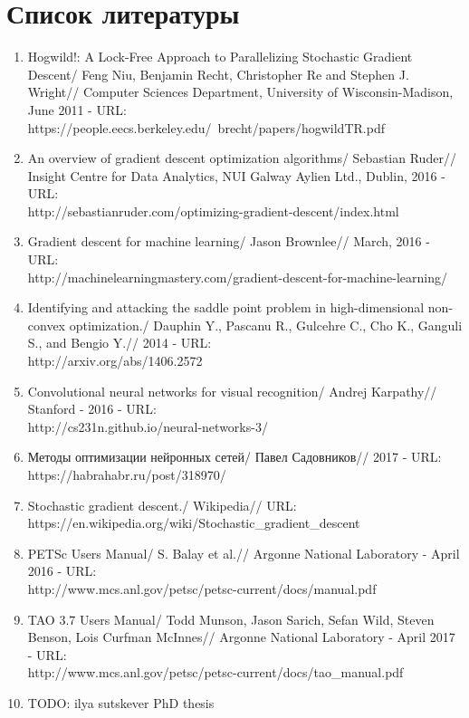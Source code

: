 \documentclass[12pt]{report}
\begin{document}
  \chapter*{Список литературы}
  \begin{enumerate}
    \item
    Hogwild!: A Lock-Free Approach to Parallelizing Stochastic Gradient Descent/
    Feng Niu, Benjamin Recht, Christopher Re and Stephen J. Wright//
    Computer Sciences Department, University of Wisconsin-Madison, June 2011 - URL:\\
    https://people.eecs.berkeley.edu/~brecht/papers/hogwildTR.pdf
    \item
    An overview of gradient descent optimization algorithms/
    Sebastian Ruder//
    Insight Centre for Data Analytics, NUI Galway Aylien Ltd., Dublin, 2016 - URL:\\
    http://sebastianruder.com/optimizing-gradient-descent/index.html
    \item
    Gradient descent for machine learning/
    Jason Brownlee//
    March, 2016 - URL:\\
    http://machinelearningmastery.com/gradient-descent-for-machine-learning/
    \item
    Identifying and attacking the saddle point problem in high-dimensional
    non-convex optimization./
    Dauphin Y., Pascanu R., Gulcehre C., Cho K., Ganguli S., and Bengio Y.//
    2014 - URL:\\
    http://arxiv.org/abs/1406.2572
    \item
    Convolutional neural networks for visual recognition/
    Andrej Karpathy//
    Stanford - 2016 - URL:\\
    http://cs231n.github.io/neural-networks-3/
    \item
    Методы оптимизации нейронных сетей/
    Павел Садовников//
    2017 - URL:\\
    https://habrahabr.ru/post/318970/
    \item
    Stochastic gradient descent./
    Wikipedia//
    URL:\\
    https://en.wikipedia.org/wiki/Stochastic\_gradient\_descent
    \item
    PETSc Users Manual/
    S. Balay et al.//
    Argonne National Laboratory - April 2016 - URL:\\
    http://www.mcs.anl.gov/petsc/petsc-current/docs/manual.pdf
    \item
    TAO 3.7 Users Manual/
    Todd Munson, Jason Sarich, Sefan Wild, Steven Benson, Lois Curfman McInnes//
    Argonne National Laboratory - April 2017 - URL:\\
    http://www.mcs.anl.gov/petsc/petsc-current/docs/tao\_manual.pdf
    \item
    {TODO: ilya sutskever PhD thesis}
  \end{enumerate}
\end{document}
